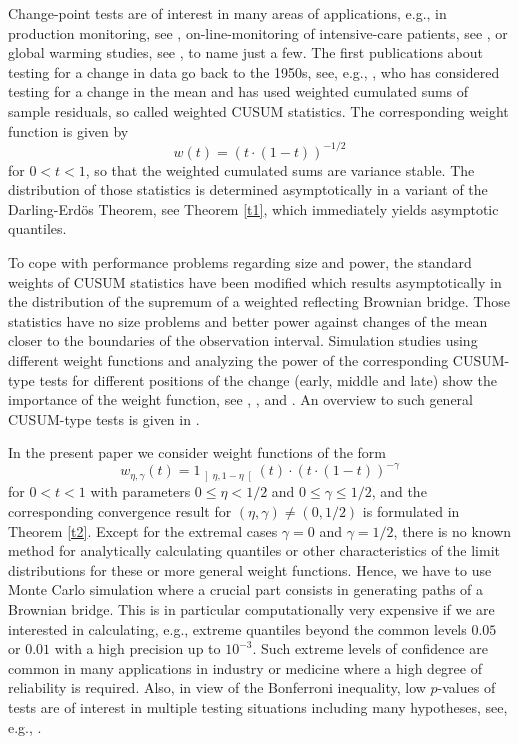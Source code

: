 \documentclass[a4paper]{amsart}
\theoremstyle{definition}
\theoremstyle{plain}
\begin{document}
Change-point tests are of interest in many areas of applications,
e.g., in production  monitoring, see \citet*{Page57},
on-line-monitoring of intensive-care patients, see \citet*{FriedImhoff04},
or global warming studies, see \citet*{GallagherEtAl13}, to name
just a few. The first publications about testing for a change in data
go back to the 1950s, see, e.g., \citet*{Page57}, who has considered
testing for a change in the mean and
has used weighted cumulated sums of sample residuals,
so called weighted CUSUM statistics. The corresponding weight
function is given by
\[
w(t) = (t \cdot (1-t))^{-1/2}
\]
for $0<t<1$, so that the weighted cumulated sums are
variance stable. The distribution of those statistics is
determined asymptotically in a variant of the
Darling-Erd\"os Theorem, see Theorem \ref{t1}, which immediately
yields asymptotic quantiles.

To cope with performance problems regarding size and power,
the standard weights of CUSUM statistics have been modified which
results asymptotically in the distribution of
the supremum of a weighted reflecting Brownian bridge.
Those statistics have no size problems and better power against changes
of the mean closer to the boundaries of the observation interval.
Simulation studies using different weight functions and analyzing the
power of the corresponding CUSUM-type tests for different positions of
the change (early, middle and late) show the importance of the weight
function, see \citet*{book:CsorgoHorvath},
\citet*{incoll:KirchTadjuidje16}, and \citet*{Dis:Schwaar}.
An overview to such general
CUSUM-type tests is given in \citet{AueHorvath13}.

In the present paper we consider weight functions of the form
\[
w_{\eta,\gamma}(t) = 1_{\left]\eta,1-\eta\right[}(t)
\cdot (t \cdot (1-t))^{-\gamma}
\]
for $0 < t < 1$ with parameters $0 \leq \eta < 1/2$ and
$0 \leq \gamma \leq 1/2$, and the corresponding convergence result for
$(\eta,\gamma) \neq (0,1/2)$ is formulated in Theorem \ref{t2}.
Except for the extremal cases $\gamma = 0$ and $\gamma = 1/2$,
there is no known method for
analytically calculating quantiles or other characteristics of the limit
distributions for these or more general weight functions.
Hence, we have to use Monte Carlo
simulation where a crucial part consists in generating paths of
a Brownian bridge. This is in
particular computationally very expensive if we are interested in
calculating, e.g., extreme quantiles beyond the common levels
$0.05$ or $0.01$ with a high precision up to $10^{-3}$. Such extreme
levels of confidence are common in many applications in industry or
medicine where a high degree of reliability is required. Also, in view
of the Bonferroni inequality, low $p$-values of tests are of interest
in multiple testing situations including many hypotheses, see, e.g.,
\citet*{Hochberg88}.
\end{document}
